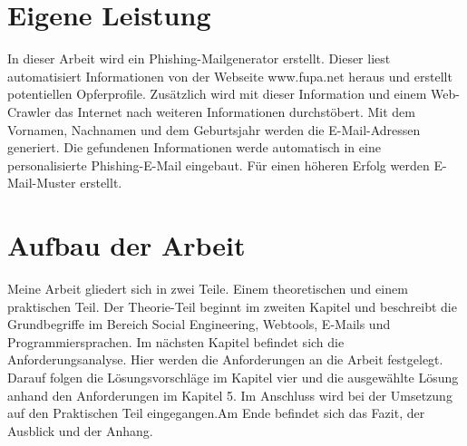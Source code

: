 \section{Eigene Leistung}
\label {sec:Leistung} 
In dieser Arbeit wird ein Phishing-Mailgenerator erstellt. Dieser liest automatisiert Informationen von der Webseite www.fupa.net heraus und erstellt potentiellen Opferprofile. Zusätzlich wird mit dieser Information und einem Web-Crawler das Internet nach weiteren Informationen durchstöbert. Mit dem Vornamen, Nachnamen und dem Geburtsjahr werden die E-Mail-Adressen generiert. Die gefundenen Informationen werde automatisch in eine personalisierte Phishing-E-Mail eingebaut. Für einen höheren Erfolg werden E-Mail-Muster erstellt.

\section{Aufbau der Arbeit}
\label {sec:Aufbau} 
Meine Arbeit gliedert sich in zwei Teile. Einem theoretischen und einem praktischen Teil. Der Theorie-Teil beginnt im zweiten Kapitel und beschreibt die Grundbegriffe im Bereich Social Engineering, Webtools, E-Mails und Programmiersprachen. Im nächsten Kapitel befindet sich die Anforderungsanalyse. Hier werden die Anforderungen an die Arbeit festgelegt. Darauf folgen die Lösungsvorschläge im Kapitel vier und die ausgewählte Lösung anhand den Anforderungen im Kapitel 5. Im Anschluss wird bei der Umsetzung auf den Praktischen Teil eingegangen.Am Ende befindet sich das Fazit, der Ausblick und der Anhang.






